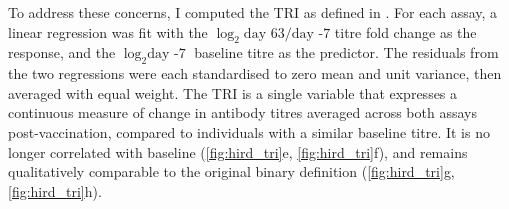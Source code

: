 %
To address these concerns, I computed the \gls{TRI} as defined in \textcite{bucasas2011EarlyPatternsGene}.
For each assay, a linear regression was fit with the $\log_2{\text{day 63}/\text{day -7}}$ titre fold change as the response, and the $\log_2{\text{day -7}}$ baseline titre as the predictor.
The residuals from the two regressions were each standardised to zero mean and unit variance, then averaged with equal weight.
The \gls{TRI} is a single variable that expresses a continuous measure of change in antibody titres averaged across both assays post-vaccination, 
compared to individuals with a similar baseline titre. 
It is no longer correlated with baseline (\cref{fig:hird_tri}e, \cref{fig:hird_tri}f),
and remains qualitatively comparable to the original binary definition (\cref{fig:hird_tri}g, \cref{fig:hird_tri}h).

